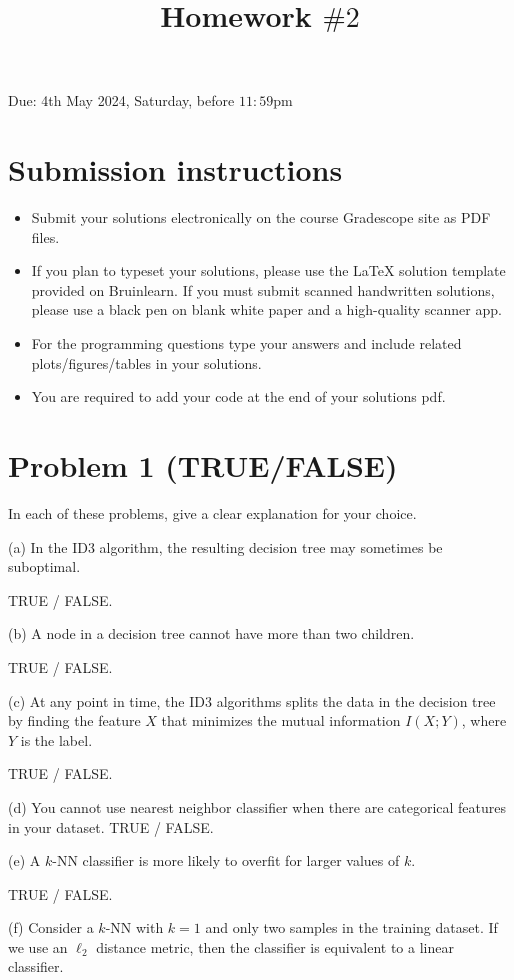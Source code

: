 \documentclass[10pt]{article}
\title{Homework $\# 2$ }
\author{}
\date{}
\begin{document}
\maketitle
Due: 4th May 2024, Saturday, before $11: 59 \mathrm{pm}$

\section*{Submission instructions}
\begin{itemize}
  \item Submit your solutions electronically on the course Gradescope site as PDF files.
  \item If you plan to typeset your solutions, please use the LaTeX solution template provided on Bruinlearn. If you must submit scanned handwritten solutions, please use a black pen on blank white paper and a high-quality scanner app.
  \item For the programming questions type your answers and include related plots/figures/tables in your solutions.
  \item You are required to add your code at the end of your solutions pdf.
\end{itemize}

\section*{Problem 1 (TRUE/FALSE)}
In each of these problems, give a clear explanation for your choice.

(a) In the ID3 algorithm, the resulting decision tree may sometimes be suboptimal.

TRUE / FALSE.

(b) A node in a decision tree cannot have more than two children.

TRUE / FALSE.

(c) At any point in time, the ID3 algorithms splits the data in the decision tree by finding the feature $X$ that minimizes the mutual information $I(X ; Y)$, where $Y$ is the label.

TRUE / FALSE.

(d) You cannot use nearest neighbor classifier when there are categorical features in your dataset. TRUE / FALSE.

(e) A $k$-NN classifier is more likely to overfit for larger values of $k$.

TRUE / FALSE.

(f) Consider a $k$-NN with $k=1$ and only two samples in the training dataset. If we use an $\ell_{2}$ distance metric, then the classifier is equivalent to a linear classifier.
\end{document}
